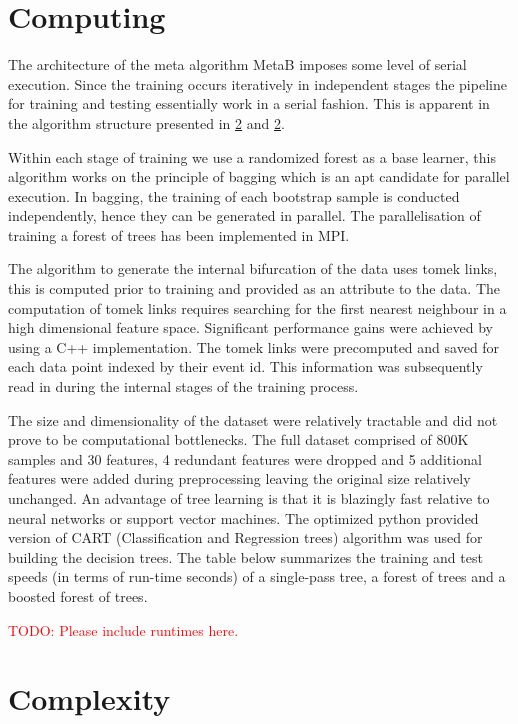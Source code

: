 
\section{Computing}

The architecture of the meta algorithm MetaB imposes some level of serial execution. Since the training occurs iteratively in independent stages the pipeline for training and testing essentially work in a serial fashion. This is apparent in the algorithm structure presented in \ref{} and \ref{}. 

Within each stage of training we use a randomized forest as a base learner, this algorithm works on the principle of bagging which is an apt candidate for parallel execution. In bagging, the training of each bootstrap sample is conducted independently, hence they can be generated in parallel. The parallelisation of training a forest of trees has been implemented in MPI. 

The algorithm to generate the internal bifurcation of the data uses tomek links, this is computed prior to training and provided as an attribute to the data. The computation of tomek links requires searching for the first nearest neighbour in a high dimensional feature space. Significant performance gains were achieved by using a C++ implementation. The tomek links were precomputed and saved for each data point indexed by their event id. This information was subsequently read in during the internal stages of the training process. 

The size and dimensionality of the dataset were relatively tractable and did not prove to be computational bottlenecks. The full dataset comprised of 800K samples and 30 features, 4 redundant features were dropped and 5 additional features were added during preprocessing leaving the original size relatively unchanged. An advantage of tree learning is that it is blazingly fast relative to neural networks or support vector machines. The optimized python provided version of CART (Classification and Regression trees) algorithm was used for building the decision trees. The table below summarizes the training and test speeds (in terms of run-time seconds) of a single-pass tree, a forest of trees and a boosted forest of trees. 

\textcolor{red}{TODO: Please include runtimes here.}
 
\section{Complexity}

